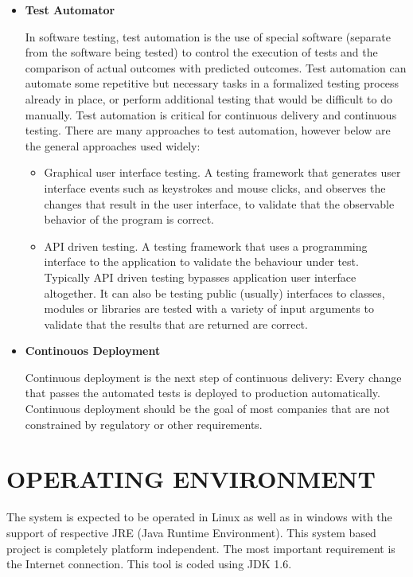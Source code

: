 \documentclass[12pt,a4paper,oneside]{report}
\begin{document}
{\begin{itemize}
 \item  \textbf{Test Automator}
\par In software testing, test automation is the use of special software (separate from the software being tested) to control the execution of tests and the comparison of actual outcomes with predicted outcomes. Test automation can automate some repetitive but necessary tasks in a formalized testing process already in place, or perform additional testing that would be difficult to do manually. Test automation is critical for continuous delivery and continuous testing. There are many approaches to test automation, however below are the general approaches used widely:

\begin{itemize}
\item Graphical user interface testing. A testing framework that generates user interface events such as keystrokes and mouse clicks, and observes the changes that result in the user interface, to validate that the observable behavior of the program is correct.
\item API driven testing. A testing framework that uses a programming interface to the application to validate the behaviour under test. Typically API driven testing bypasses application user interface altogether. It can also be testing public (usually) interfaces to classes, modules or libraries are tested with a variety of input arguments to validate that the results that are returned are correct.
\end{itemize}


\item \textbf{Continouos Deployment}
\par Continuous deployment is the next step of continuous delivery: Every change that passes the automated tests is deployed to production automatically. Continuous deployment should be the goal of most companies that are not constrained by regulatory or other requirements.

\end{itemize}

 
\section{OPERATING ENVIRONMENT}
The system is expected to be operated in Linux as well as in windows with the support of
respective JRE (Java Runtime Environment). This system based project is completely platform
independent. The most important requirement is the Internet connection. This tool is coded
using JDK 1.6.
}
\end{document}
